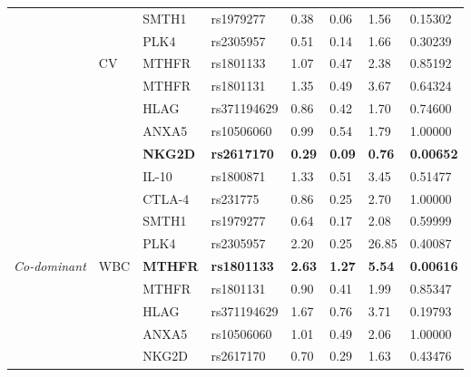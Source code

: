 \begin{table}[!ht]
\begin{tabular}{llllllll}
 &   & SMTH1          & rs1979277          & 0.38          & 0.06          & 1.56     & 0.15302          \\ \cline{3-8} 
 &                      & PLK4           & rs2305957          & 0.51          & 0.14  & 1.66          & 0.30239          \\ \hline
\multirow{9}{*}{}  & \multirow{9}{*}{CV}  & MTHFR          & rs1801133          & 1.07          & 0.47          & 2.38          & 0.85192          \\ \cline{3-8} 
&                      & MTHFR          & rs1801131          & 1.35          & 0.49   & 3.67          & 0.64324          \\ \cline{3-8} 
 & & HLAG           & rs371194629        & 0.86          & 0.42          & 1.70       & 0.74600          \\ \cline{3-8} 
 &   & ANXA5          & rs10506060         & 0.99          & 0.54          & 1.79    & 1.00000          \\ \cline{3-8} 
 &  & \textbf{NKG2D} & \textbf{rs2617170} & \textbf{0.29} & \textbf{0.09} & \textbf{0.76} & \textbf{0.00652} \\ \cline{3-8} 
 &   & IL-10          & rs1800871          & 1.33          & 0.51          & 3.45     & 0.51477          \\ \cline{3-8} 
 &  & CTLA-4         & rs231775           & 0.86          & 0.25          & 2.70      & 1.00000   \\ \cline{3-8} 
&  & SMTH1  & rs1979277   & 0.64  & 0.17   & 2.08 & 0.59999          \\ \cline{3-8} 
 &   & PLK4           & rs2305957          & 2.20          & 0.25          & 26.85    & 0.40087  \\ \hline
 \multirow{9}{*}{\textit{Co-dominant}} &
  \multirow{9}{*}{WBC} &
  \textbf{MTHFR} &
  \textbf{rs1801133} &
  \textbf{2.63} &
  \textbf{1.27} &
  \textbf{5.54} &
  \textbf{0.00616} \\ \cline{3-8} 
&  & MTHFR          & rs1801131          & 0.90   & 0.41          & 1.99          & 0.85347          \\ \cline{3-8} 
 &   & HLAG           & rs371194629        & 1.67          & 0.76          & 3.71    & 0.19793          \\ \cline{3-8} 
&   & ANXA5          & rs10506060         & 1.01          & 0.49          & 2.06          & 1.00000  \\ \cline{3-8} 
&   & NKG2D   & rs2617170          & 0.70          & 0.29          & 1.63       & 0.43476    \\ \cline{3-8} 

\end{tabular}
\end{table}
